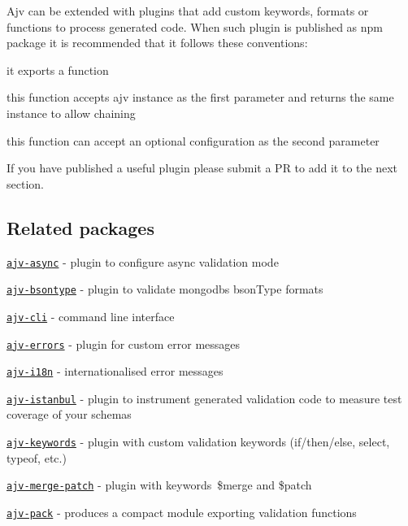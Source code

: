 Ajv can be extended with plugins that add custom keywords, formats or functions to process generated code. When such plugin is published as npm package it is recommended that it follows these conventions\+:


\begin{DoxyItemize}
\item it exports a function
\item this function accepts ajv instance as the first parameter and returns the same instance to allow chaining
\item this function can accept an optional configuration as the second parameter
\end{DoxyItemize}

If you have published a useful plugin please submit a PR to add it to the next section.

\subsection*{Related packages}


\begin{DoxyItemize}
\item \href{https://github.com/epoberezkin/ajv-async}{\tt ajv-\/async} -\/ plugin to configure async validation mode
\item \href{https://github.com/BoLaMN/ajv-bsontype}{\tt ajv-\/bsontype} -\/ plugin to validate mongodb\textquotesingle{}s bson\+Type formats
\item \href{https://github.com/jessedc/ajv-cli}{\tt ajv-\/cli} -\/ command line interface
\item \href{https://github.com/epoberezkin/ajv-errors}{\tt ajv-\/errors} -\/ plugin for custom error messages
\item \href{https://github.com/epoberezkin/ajv-i18n}{\tt ajv-\/i18n} -\/ internationalised error messages
\item \href{https://github.com/epoberezkin/ajv-istanbul}{\tt ajv-\/istanbul} -\/ plugin to instrument generated validation code to measure test coverage of your schemas
\item \href{https://github.com/epoberezkin/ajv-keywords}{\tt ajv-\/keywords} -\/ plugin with custom validation keywords (if/then/else, select, typeof, etc.)
\item \href{https://github.com/epoberezkin/ajv-merge-patch}{\tt ajv-\/merge-\/patch} -\/ plugin with keywords \$merge and \$patch
\item \href{https://github.com/epoberezkin/ajv-pack}{\tt ajv-\/pack} -\/ produces a compact module exporting validation functions
\end{DoxyItemize}

